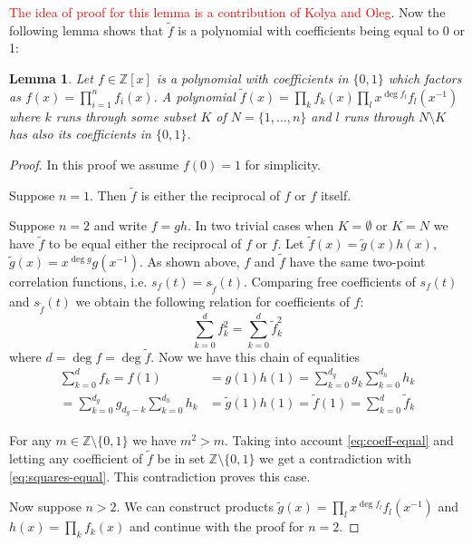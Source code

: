 \documentclass[12pt, a4paper]{article}
\newtheorem{lemma}{Lemma}
\begin{document}
\textcolor{red}{The idea of proof for this lemma is a contribution of Kolya and
  Oleg}.
Now the following lemma shows that $\tilde{f}$ is a polynomial with coefficients
being equal to 0 or 1:
\begin{lemma}
  Let $f \in \mathbb{Z}[x]$ is a polynomial with coefficients in $\{0, 1\}$
  which factors as $f(x) = \prod_{i=1}^n f_i(x)$. A polynomial
  $\tilde{f}(x) = \prod_k f_k(x) \prod_l x^{\deg f_l} f_l(x^{-1})$ where $k$
  runs through some subset $K$ of $N = \{1, \dots, n\}$ and $l$ runs through
  $N \setminus K$ has also its coefficients in $\{0, 1\}$.
\end{lemma}
\begin{proof}
  In this proof we assume $f(0) = 1$ for simplicity.

  Suppose $n = 1$. Then $\tilde{f}$ is either the reciprocal of $f$ or $f$ itself.

  Suppose $n = 2$ and write $f = gh$. In two trivial cases when $K = \emptyset$
  or $K = N$ we have $\tilde{f}$ to be equal either the reciprocal of $f$ or
  $f$. Let $\tilde{f}(x) = \tilde{g}(x)h(x)$,
  $\tilde{g}(x) = x^{\deg g}g(x^{-1})$. As shown above, $f$ and $\tilde{f}$ have
  the same two-point correlation functions, i.e.
  $s_f(t) = s_{\tilde{f}}(t)$. Comparing free coefficients of $s_f(t)$ and
  $s_{\tilde{f}}(t)$ we obtain the following relation for coefficients of $f$:
  \begin{equation}
    \sum_{k=0}^d f_k^2 = \sum_{k=0}^d \tilde{f}_k^2
    \label{eq:squares-equal}
  \end{equation}
  where $d = \deg f = \deg \tilde{f}$. Now we have this chain of equalities
  \begin{equation}
    \begin{aligned}
    \sum_{k=0}^d f_k = f(1) &= g(1) h(1) = \sum_{k=0}^{d_g} g_k \sum_{k=0}^{d_h} h_k \\
    = \sum_{k=0}^{d_g} g_{d_g-k} \sum_{k=0}^{d_h} h_k &= \tilde{g}(1) h(1) =
    \tilde{f}(1) = \sum_{k=0}^d \tilde{f}_k
    \end{aligned}
    \label{eq:coeff-equal}
  \end{equation}

  For any $m \in \mathbb{Z} \setminus \{0, 1\}$ we have $m^2 > m$. Taking into
  account \cref{eq:coeff-equal} and letting any coefficient of $\tilde{f}$ be
  in set $\mathbb{Z} \setminus \{0, 1\}$ we get a contradiction with
  \cref{eq:squares-equal}. This contradiction proves this case.

  Now suppose $n > 2$. We can construct products
  $\tilde{g}(x) = \prod_l x^{\deg f_l }f_l(x^{-1})$ and $h(x) = \prod_k f_k(x)$
  and continue with the proof for $n = 2$.
\end{proof}
\end{document}
